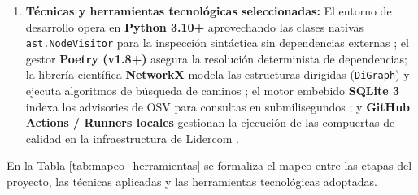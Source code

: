 \begin{enumerate}[leftmargin=1.27cm, label=\alph*)]
    \item \textbf{Técnicas y herramientas tecnológicas seleccionadas:}
    El entorno de desarrollo opera en \textbf{Python 3.10+} aprovechando las clases nativas \texttt{ast.NodeVisitor} para la inspección sintáctica sin dependencias externas \parencite{salis2021pycg}; %
    el gestor \textbf{Poetry (v1.8+)} asegura la resolución determinista de dependencias; %
    la librería científica \textbf{NetworkX} modela las estructuras dirigidas (\texttt{DiGraph}) y ejecuta algoritmos de búsqueda de caminos \parencite{hagberg2008exploring}; %
    el motor embebido \textbf{SQLite 3} indexa los advisories de OSV para consultas en submilisegundos \parencite{openssf2023osv}; %
    y \textbf{GitHub Actions / Runners locales} gestionan la ejecución de las compuertas de calidad en la infraestructura de Lidercom \parencite{humble2010continuous}. %
\end{enumerate}

En la Tabla \ref{tab:mapeo_herramientas} se formaliza el mapeo entre las etapas del proyecto, las técnicas aplicadas y las herramientas tecnológicas adoptadas.

